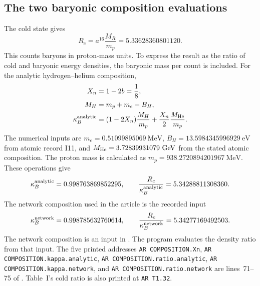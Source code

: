 \documentclass[aps,prx,onecolumn,10pt,notitlepage,nofootinbib,longbibliography]{revtex4-2}
\numberwithin{equation}{section}
\numberwithin{table}{section}
\begin{document}
\subsection{The two baryonic composition evaluations}
\label{sec:composition-repository-protocol}\label{sec:composition}
The cold state gives
\begin{equation}
 R_c=a^{16}\frac{M_R}{m_p}=5.33628360801120.
\end{equation}
This counts baryons in proton-mass units. To express the result as the
ratio of cold and baryonic energy densities, the baryonic mass per count is
included. For the analytic hydrogen--helium composition,
\begin{align}
 X_n&=1-2b=\frac18,\notag\\
 M_H&=m_p+m_e-B_H,\notag\\
 \kappa_B^{\rm analytic}
 &=(1-2X_n)\frac{M_H}{m_p}+\frac{X_n}{2}\frac{M_{\rm He}}{m_p}.
\label{eq:atomicbaryons}
\end{align}
The numerical inputs are
$m_e=0.51099895069\ \mathrm{MeV}$,
$B_H=13.5984345996929\ \mathrm{eV}$ from atomic record I11,
and $M_{\rm He}=3.72839931079\ \mathrm{GeV}$ from the stated atomic
composition. The proton mass is calculated as
$m_p=938.2720894201967\ \mathrm{MeV}$. These operations give
\begin{equation}
 \kappa_B^{\rm analytic}=0.998763869852295,
 \qquad \frac{R_c}{\kappa_B^{\rm analytic}}=5.34288811308360.
\end{equation}
The network composition used in the article is the recorded input
\begin{equation}
 \kappa_B^{\rm network}=0.998785632760614,
 \qquad \frac{R_c}{\kappa_B^{\rm network}}=5.34277169492503.
\end{equation}
The network composition is an input in . The program  evaluates the density ratio from that input.
The five printed addresses \texttt{AR COMPOSITION.Xn},
\texttt{AR COMPOSITION.kappa.analytic},
\texttt{AR COMPOSITION.ratio.analytic},
\texttt{AR COMPOSITION.kappa.network}, and
\texttt{AR COMPOSITION.ratio.network} are lines~71--75 of
. Table~I's cold ratio is also printed at
\texttt{AR T1.32}.
\end{document}
